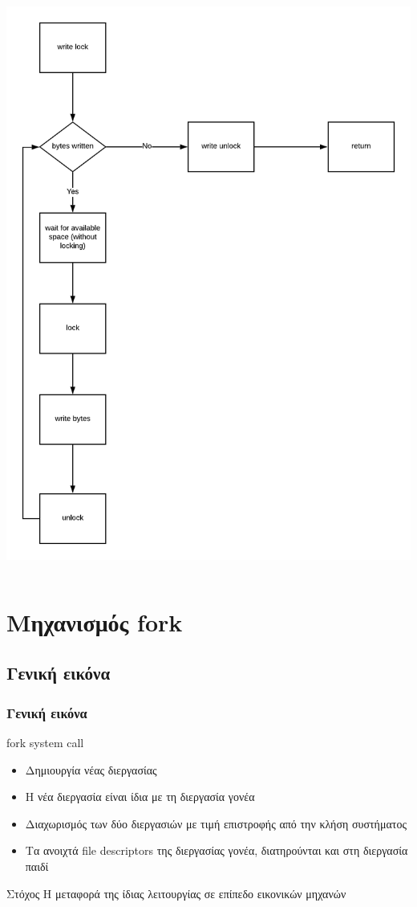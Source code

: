 \documentclass[red,slidestop,notes,compress,mathserif]{beamer}
\begin{document}
\begin{frame}
\begin{columns}
\includegraphics[scale=0.4]{figures/pipe_write.png}
\end{columns}
\end{frame}

\section{Μηχανισμός fork}
\subsection{Γενική εικόνα}
\begin{frame}
\frametitle{Γενική εικόνα}
\begin{block}{fork system call}
\begin{itemize}
\item Δημιουργία νέας διεργασίας
\item Η νέα διεργασία είναι ίδια με τη διεργασία γονέα
\item Διαχωρισμός των δύο διεργασιών με τιμή επιστροφής από την κλήση συστήματος
\item Τα ανοιχτά file descriptors της διεργασίας γονέα, διατηρούνται και στη διεργασία παιδί
\end{itemize}
\end{block}
\pause
\begin{block}{Στόχος}
Η μεταφορά της ίδιας λειτουργίας σε επίπεδο εικονικών μηχανών
\end{block}
\end{frame}
\end{document}
